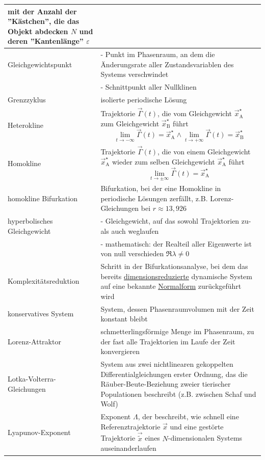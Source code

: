 \documentclass{article}
\begin{document}
\begin{xltabular}{\linewidth}{p{6cm}|X}
		mit der Anzahl der ''Kästchen'', die das Objekt abdecken $N$ und deren ''Kantenlänge'' $\varepsilon$ \\
	\hline
		Gleichgewichtspunkt & - Punkt im Phasenraum, an dem die Änderungsrate aller Zustandsvariablen des Systems verschwindet \\
		& - Schnittpunkt aller Nullklinen \\
	\hline
		Grenzzyklus & isolierte periodische Lösung \\
	\hline
		Heterokline & Trajektorie $\vec{\Gamma}(t)$, die vom Gleichgewicht $\vec{x}_\text{A}^\star$ zum Gleichgewicht $\vec{x}_\text{B}^\star$ führt 
			$$\lim_{t \to -\infty} \vec{\Gamma}(t) = \vec{x}_\text{A}^\star \wedge \lim_{t \to +\infty} \vec{\Gamma}(t) = \vec{x}_\text{B}^\star $$ \\
	\hline
		Homokline & Trajektorie $\vec{\Gamma}(t)$, die von einem Gleichgewicht $\vec{x}_\text{A}^\star$ wieder zum selben Gleichgewicht $\vec{x}_\text{A}^\star$ führt 
			$$\lim_{t \to \pm\infty} \vec{\Gamma}(t) = \vec{x}_\text{A}^\star$$ \\
	\hline
		homokline Bifurkation & Bifurkation, bei der eine Homokline in periodische Lösungen zerfällt, z.B. Lorenz-Gleichungen bei $r \approx 13,926$ \\
	\hline
		hyperbolisches Gleichgewicht & - Gleichgewicht, auf das sowohl Trajektorien zu- als auch weglaufen \\
		& - mathematisch: der Realteil aller Eigenwerte ist von null verschieden $\Re \lambda \neq 0$ \\
	\hline
		Komplexitätsreduktion & Schritt in der Bifurkationsanalyse, bei dem das bereits \underline{dimensionsreduzierte} dynamische System auf eine bekannte \underline{Normalform} zurückgeführt wird \\
	\hline
		konservatives System & System, dessen Phasenraumvolumen mit der Zeit konstant bleibt \\
	\hline
		Lorenz-Attraktor & schmetterlingsförmige Menge im Phasenraum, zu der fast alle Trajektorien im Laufe der Zeit konvergieren \\
	\hline
		Lotka-Volterra-Gleichungen & System aus zwei nichtlinearen gekoppelten Differentialgleichungen erster Ordnung, das die Räuber-Beute-Beziehung zweier tierischer Populationen beschreibt (z.B. zwischen Schaf und Wolf) \\
	\hline
		Lyapunov-Exponent & Exponent $\Lambda$, der beschreibt, wie schnell eine Referenztrajektorie $\vec{x}$ und eine gestörte Trajektorie $\vec{\tilde{x}}$ eines $N$-dimensionalen Systems auseinanderlaufen \\

\end{xltabular}
\end{document}
